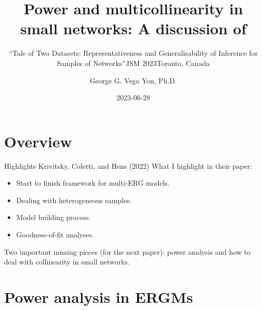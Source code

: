 \documentclass[
  ignorenonframetext,
  aspectratio=169,
]{beamer}
\title{Power and multicollinearity in small networks: A discussion of}
\subtitle{``Tale of Two Datasets: Representativeness and
Generalisability of Inference for Samples of Networks''JSM 2023Toronto,
Canada}
\author{George G. Vega Yon, Ph.D.}
\date{2023-06-28}
\institute{The University of Utah}
\begin{document}
\frame{\titlepage}
\ifdefined\Shaded\renewenvironment{Shaded}{\begin{tcolorbox}[boxrule=0pt, breakable, interior hidden, sharp corners, borderline west={3pt}{0pt}{shadecolor}, frame hidden, enhanced]}{\end{tcolorbox}}\fi

\hypertarget{overview}{%
\section{Overview}\label{overview}}

\begin{frame}{Highlights Krivitsky, Coletti, and Hens (2022)}
\protect\hypertarget{highlights-krivitskytaletwodatasets2022}{}
What I highlight in their paper:

\begin{itemize}
\item
  Start to finish framework for multi-ERG models.
\item
  Dealing with heterogeneous samples.
\item
  Model building process.
\item
  Goodness-of-fit analyses.
\end{itemize}

Two important missing pieces (for the next paper): power analysis and
how to deal with collinearity in small networks.
\end{frame}

\hypertarget{power-analysis-in-ergms}{%
\section{Power analysis in ERGMs}\label{power-analysis-in-ergms}}
\end{document}
